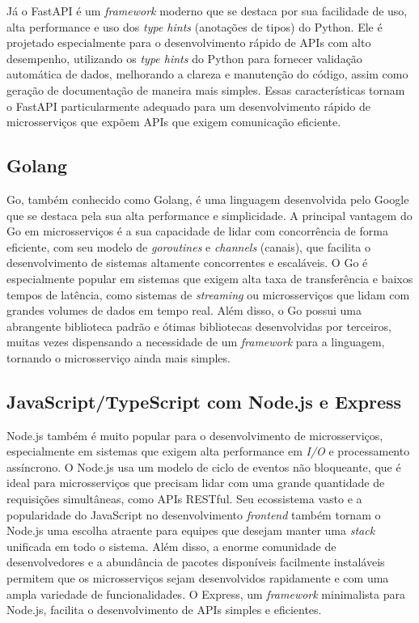 Já o FastAPI é um \emph{framework} moderno que se destaca por sua facilidade de uso, alta performance e uso dos \emph{type hints} (anotações de tipos) do Python. Ele é projetado especialmente para o desenvolvimento rápido de APIs com alto desempenho, utilizando os \emph{type hints} do Python para fornecer validação automática de dados, melhorando a clareza e manutenção do código, assim como geração de documentação de maneira mais simples. Essas características tornam o FastAPI particularmente adequado para um desenvolvimento rápido de microsserviços que expõem APIs que exigem comunicação eficiente.
\cite{fastapi}

\subsection{Golang}

Go, também conhecido como Golang, é uma linguagem desenvolvida pelo Google que se destaca pela sua alta performance e simplicidade. A principal vantagem do Go em microsserviços é a sua capacidade de lidar com concorrência de forma eficiente, com seu modelo de \emph{goroutines} e \emph{channels} (canais), que facilita o desenvolvimento de sistemas altamente concorrentes e escaláveis. O Go é especialmente popular em sistemas que exigem alta taxa de transferência e baixos tempos de latência, como sistemas de \emph{streaming} ou microsserviços que lidam com grandes volumes de dados em tempo real. Além disso, o Go possui uma abrangente biblioteca padrão e ótimas bibliotecas desenvolvidas por terceiros, muitas vezes dispensando a necessidade de um \emph{framework} para a linguagem, tornando o microsserviço ainda mais simples.
\cite{golang}

\subsection{JavaScript/TypeScript com Node.js e Express}

Node.js também é muito popular para o desenvolvimento de microsserviços, especialmente em sistemas que exigem alta performance em \emph{I/O} e processamento assíncrono. O Node.js usa um modelo de ciclo de eventos não bloqueante, que é ideal para microsserviços que precisam lidar com uma grande quantidade de requisições simultâneas, como APIs RESTful. Seu ecossistema vasto e a popularidade do JavaScript no desenvolvimento \emph{frontend} também tornam o Node.js uma escolha atraente para equipes que desejam manter uma \emph{stack} unificada em todo o sistema. Além disso, a enorme comunidade de desenvolvedores e a abundância de pacotes disponíveis facilmente instaláveis permitem que os microsserviços sejam desenvolvidos rapidamente e com uma ampla variedade de funcionalidades. O Express, um \emph{framework} minimalista para Node.js, facilita o desenvolvimento de APIs simples e eficientes. 
\cite{expressjs,nodejs}

